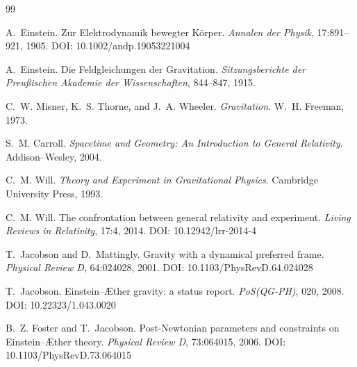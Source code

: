 \documentclass[12pt,a4paper]{article}
\newcommand{\AEther}{\AE{}ther}
\begin{document}
        \begin{thebibliography}{99}
            
            A.~Einstein.
            \newblock Zur Elektrodynamik bewegter K\"orper.
            \newblock \emph{Annalen der Physik}, 17:891--921, 1905.
            \newblock DOI: 10.1002/andp.19053221004
            
            A.~Einstein.
            \newblock Die Feldgleichungen der Gravitation.
            \newblock \emph{Sitzungsberichte der Preu\ss{}ischen Akademie der Wissenschaften},
            844--847, 1915.
            
            C.~W. Misner, K.~S. Thorne, and J.~A. Wheeler.
            \newblock \emph{Gravitation}.
            \newblock W.~H. Freeman, 1973.
            
            S.~M. Carroll.
            \newblock \emph{Spacetime and Geometry: An Introduction to General Relativity}.
            \newblock Addison--Wesley, 2004.
            
            C.~M. Will.
            \newblock \emph{Theory and Experiment in Gravitational Physics}.
            \newblock Cambridge University Press, 1993.
            
            C.~M. Will.
            \newblock The confrontation between general relativity and experiment.
            \newblock \emph{Living Reviews in Relativity}, 17:4, 2014.
            \newblock DOI: 10.12942/lrr-2014-4
            
            T.~Jacobson and D.~Mattingly.
            \newblock Gravity with a dynamical preferred frame.
            \newblock \emph{Physical Review D}, 64:024028, 2001.
            \newblock DOI: 10.1103/PhysRevD.64.024028
            
            T.~Jacobson.
            \newblock Einstein--\AEther{} gravity: a status report.
            \newblock \emph{PoS(QG-PH)}, 020, 2008.
            \newblock DOI: 10.22323/1.043.0020
            
            B.~Z. Foster and T.~Jacobson.
            \newblock Post-Newtonian parameters and constraints on Einstein--\AEther{} theory.
            \newblock \emph{Physical Review D}, 73:064015, 2006.
            \newblock DOI: 10.1103/PhysRevD.73.064015
            

\end{thebibliography}
\end{document}
